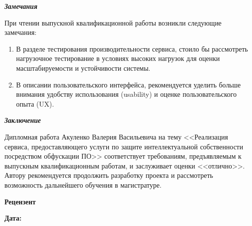 \documentclass[12pt, a4paper, titlepage]{extarticle}
\begin{document}
	\textbf{\textit{Замечания}}

		При чтении выпускной квалификационной работы возникли следующие замечания:
		\begin{enumerate}
			\item В разделе тестирования производительности сервиса, стоило бы рассмотреть нагрузочное тестирование в условиях высоких нагрузок для оценки масштабируемости и устойчивости системы.

			\item В описании пользовательского интерфейса, рекомендуется уделить больше внимания удобству использования (usability) и оценке пользовательского опыта (UX).
		\end{enumerate}

	\pagebreak
	\textbf{\textit{Заключение}}

		Дипломная работа Акуленко Валерия Васильевича на тему <<Реализация сервиса, предоставляющего услуги по защите интеллектуальной собственности посредством обфускации ПО>> соответствует требованиям, предъявляемым к выпускным квалификационным работам, и заслуживает оценки <<отлично>>. Автору рекомендуется продолжить разработку проекта и рассмотреть возможность дальнейшего обучения в магистратуре.

	\textbf{Рецензент}

	\hfill {}

	\vspace{15pt}
	\textbf{Дата:} 

	\vspace{40pt}
\end{document}
